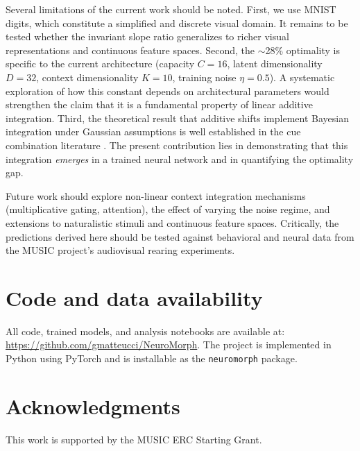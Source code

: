 \documentclass[11pt,a4paper]{article}
\begin{document}
Several limitations of the current work should be noted.
First, we use MNIST digits, which constitute a simplified and discrete visual domain.
It remains to be tested whether the invariant slope ratio generalizes to richer visual representations and continuous feature spaces.
Second, the $\sim$28\% optimality is specific to the current architecture (capacity $C = 16$, latent dimensionality $D = 32$, context dimensionality $K = 10$, training noise $\eta = 0.5$).
A systematic exploration of how this constant depends on architectural parameters would strengthen the claim that it is a fundamental property of linear additive integration.
Third, the theoretical result that additive shifts implement Bayesian integration under Gaussian assumptions is well established in the cue combination literature \citep{ernst2002humans, ma2006bayesian}.
The present contribution lies in demonstrating that this integration \emph{emerges} in a trained neural network and in quantifying the optimality gap.

Future work should explore non-linear context integration mechanisms (multiplicative gating, attention), the effect of varying the noise regime, and extensions to naturalistic stimuli and continuous feature spaces.
Critically, the predictions derived here should be tested against behavioral and neural data from the MUSIC project's audiovisual rearing experiments.


\section*{Code and data availability}

All code, trained models, and analysis notebooks are available at: \url{https://github.com/gmatteucci/NeuroMorph}.
The project is implemented in Python using PyTorch and is installable as the \texttt{neuromorph} package.

\section*{Acknowledgments}

This work is supported by the MUSIC ERC Starting Grant.




\end{document}
